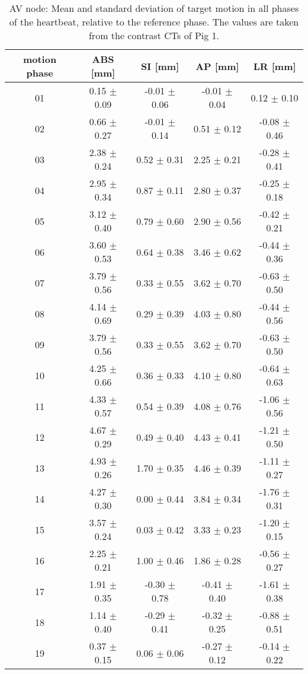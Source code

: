 \newpage

\begin{table}[H]
  \centering
  \scriptsize
  \caption{AV node: Mean and standard deviation of target motion in all phases of the heartbeat, relative to the reference phase. The values are 
  taken from the contrast CTs of Pig 1.}
  \begin{tabular}{|c|c|c|c|c|}
    \hline\hline
    motion phase\rule{0pt}{2.6ex}\rule[-1.2ex]{0pt}{0pt} & ABS [mm] & SI [mm] & AP [mm] & LR [mm]\\
    \hline
01 &0.15 $\pm$ 0.09 &-0.01 $\pm$ 0.06 &-0.01 $\pm$ 0.04 &0.12 $\pm$ 0.10 \\
02 &0.66 $\pm$ 0.27 &-0.01 $\pm$ 0.14 &0.51 $\pm$ 0.12 &-0.08 $\pm$ 0.46 \\
03 &2.38 $\pm$ 0.24 &0.52 $\pm$ 0.31 &2.25 $\pm$ 0.21 &-0.28 $\pm$ 0.41 \\
04 &2.95 $\pm$ 0.34 &0.87 $\pm$ 0.11 &2.80 $\pm$ 0.37 &-0.25 $\pm$ 0.18 \\
05 &3.12 $\pm$ 0.40 &0.79 $\pm$ 0.60 &2.90 $\pm$ 0.56 &-0.42 $\pm$ 0.21 \\
06 &3.60 $\pm$ 0.53 &0.64 $\pm$ 0.38 &3.46 $\pm$ 0.62 &-0.44 $\pm$ 0.36 \\
07 &3.79 $\pm$ 0.56 &0.33 $\pm$ 0.55 &3.62 $\pm$ 0.70 &-0.63 $\pm$ 0.50 \\
08 &4.14 $\pm$ 0.69 &0.29 $\pm$ 0.39 &4.03 $\pm$ 0.80 &-0.44 $\pm$ 0.56 \\
09 &3.79 $\pm$ 0.56 &0.33 $\pm$ 0.55 &3.62 $\pm$ 0.70 &-0.63 $\pm$ 0.50 \\
10 &4.25 $\pm$ 0.66 &0.36 $\pm$ 0.33 &4.10 $\pm$ 0.80 &-0.64 $\pm$ 0.63 \\
11 &4.33 $\pm$ 0.57 &0.54 $\pm$ 0.39 &4.08 $\pm$ 0.76 &-1.06 $\pm$ 0.56 \\
12 &4.67 $\pm$ 0.29 &0.49 $\pm$ 0.40 &4.43 $\pm$ 0.41 &-1.21 $\pm$ 0.50 \\
13 &4.93 $\pm$ 0.26 &1.70 $\pm$ 0.35 &4.46 $\pm$ 0.39 &-1.11 $\pm$ 0.27 \\
14 &4.27 $\pm$ 0.30 &0.00 $\pm$ 0.44 &3.84 $\pm$ 0.34 &-1.76 $\pm$ 0.31 \\
15 &3.57 $\pm$ 0.24 &0.03 $\pm$ 0.42 &3.33 $\pm$ 0.23 &-1.20 $\pm$ 0.15 \\
16 &2.25 $\pm$ 0.21 &1.00 $\pm$ 0.46 &1.86 $\pm$ 0.28 &-0.56 $\pm$ 0.27 \\
17 &1.91 $\pm$ 0.35 &-0.30 $\pm$ 0.78 &-0.41 $\pm$ 0.40 &-1.61 $\pm$ 0.38 \\
18 &1.14 $\pm$ 0.40 &-0.29 $\pm$ 0.41 &-0.32 $\pm$ 0.25 &-0.88 $\pm$ 0.51 \\
19 &0.37 $\pm$ 0.15 &0.06 $\pm$ 0.06 &-0.27 $\pm$ 0.12 &-0.14 $\pm$ 0.22 \\
    \hline\hline
  \end{tabular}
  \label{tab:motion:AV:Pig1}
\end{table}

